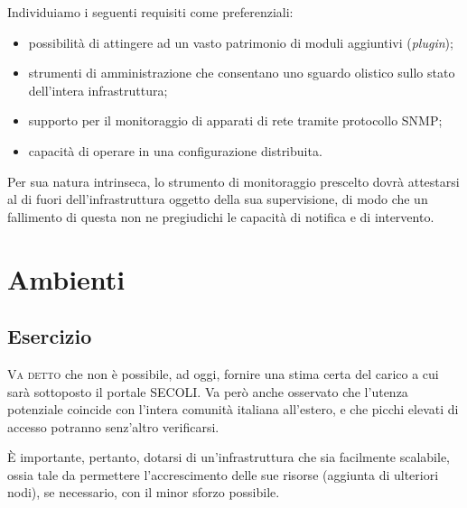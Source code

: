 \documentclass[headinclude,footinclude,a4paper,11pt,final]{scrreprt}
\begin{document}
Individuiamo i seguenti requisiti come preferenziali:
\begin{itemize}
\item possibilità di attingere ad un vasto patrimonio di moduli aggiuntivi (\emph{plugin});
\item strumenti di amministrazione che consentano uno sguardo olistico sullo stato dell'intera infrastruttura;
\item supporto per il monitoraggio di apparati di rete tramite protocollo SNMP;
\item capacità di operare in una configurazione distribuita.
\end{itemize}

Per sua natura intrinseca, lo strumento di monitoraggio prescelto dovrà attestarsi al di fuori dell'infrastruttura oggetto della sua supervisione, di modo che un fallimento di questa non ne pregiudichi le capacità di notifica e di intervento.



\chapter{Ambienti}

\section{Esercizio}

\lettrine{V}{a detto} che non è possibile, ad oggi, fornire una stima certa del carico a cui sarà sottoposto il portale SECOLI.  Va però anche osservato che l'utenza potenziale coincide con l'intera comunità italiana all'estero, e che picchi elevati di accesso potranno senz'altro verificarsi.

È importante, pertanto, dotarsi di un'infrastruttura che sia facilmente scalabile, ossia tale da permettere l'accrescimento delle sue risorse (aggiunta di ulteriori nodi), se necessario, con il minor sforzo possibile.
\end{document}
